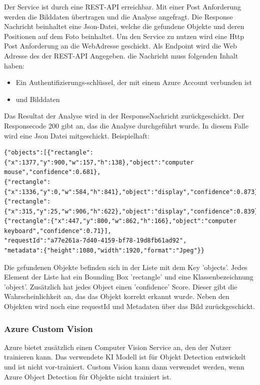 Der Service ist durch eine REST-API erreichbar. Mit einer Post Anforderung werden die Bilddaten übertragen und die Analyse angefragt. Die Response Nachricht beinhaltet eine Json-Datei, welche die gefundene Objekte und deren Positionen auf dem Foto beinhaltet. 
Um den Service zu nutzen wird eine Http Post Anforderung an die WebAdresse geschickt. Als Endpoint wird die Web Adresse des der REST-API Angegeben. die Nachricht muss folgenden Inhalt haben:
\begin{itemize}
	\item Ein Authentifizierungs-schlüssel, der mit einem Azure Account verbunden ist
	\item und Bilddaten
\end{itemize}

Das Resultat der Analyse wird in der ResponseNachricht zurückgeschickt. Der Responsecode 200 gibt an, das die Analyse durchgeführt wurde. In diesem Falle wird eine Json Datei mitgeschickt. Beispielhaft:

\begin{lstlisting}
{"objects":[{"rectangle":{"x":1377,"y":900,"w":157,"h":138},"object":"computer mouse","confidence":0.681},
{"rectangle":{"x":1336,"y":0,"w":584,"h":841},"object":"display","confidence":0.873},
{"rectangle":{"x":315,"y":25,"w":906,"h":622},"object":"display","confidence":0.839},
{"rectangle":{"x":447,"y":800,"w":862,"h":166},"object":"computer keyboard","confidence":0.71}],
"requestId":"a77e261a-7d40-4159-bf78-19d8fb61ad92",
"metadata":{"height":1080,"width":1920,"format":"Jpeg"}}
\end{lstlisting}

Die gefundenen Objekte befinden sich in der Liste mit dem Key 'objects'. Jedes Element der Liste hat ein Bounding Box 'rectangle' und eine Klassenbezeichnung 'object'. Zusätzlich hat jedes Object einen 'confidence' Score. Dieser gibt die Wahrscheinlichkeit an, das das Objekt korrekt erkannt wurde. 
Neben den Objekten wird noch eine requestId und Metadaten über das Bild zurückgeschickt.

\subsubsection{Azure Custom Vision}
Azure bietet zusätzlich einen Computer Vision Service an, den der Nutzer trainieren kann. 
Das verwendete KI Modell ist für Objekt Detection entwickelt und ist nicht vor-trainiert.
Custom Vision kann dann verwendet werden, wenn Azure Object Detection für Objekte nicht trainiert ist.\citep{Azure302bDoc}

